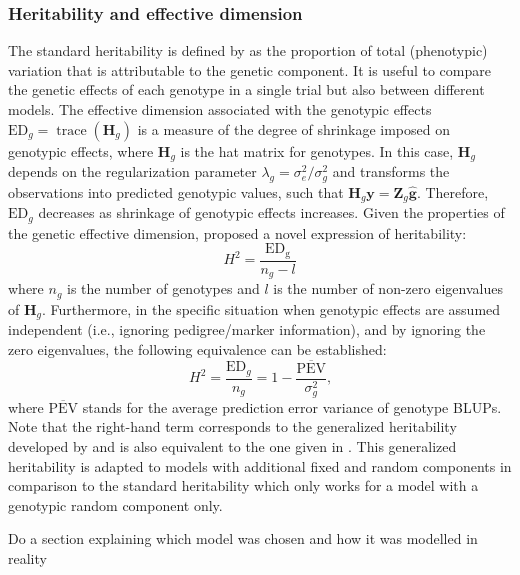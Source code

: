 \subsubsection{Heritability and effective dimension}
The standard heritability is defined by \textcite{rodriguez-alvarez_correcting_2018} as the proportion of total (phenotypic) variation that is attributable to the genetic component. It is useful to compare the genetic effects of each genotype in a single trial but also between different models. The effective dimension associated with the genotypic effects $\mathrm{ED}_g = \operatorname{trace}(\mathbf{H}_g)$ is a measure of the degree of shrinkage imposed on genotypic effects, where $\mathbf{H}_g$ is the hat matrix for genotypes. In this case, $\mathbf{H}_g$ depends on the regularization parameter $\lambda_g = \sigma^2_e/\sigma^2_g$ and transforms
the observations into predicted genotypic values, such
that $\mathbf{H}_g\mathbf{y} = \mathbf{Z}_g\mathbf{\hat{g}}$. Therefore, $\mathrm{ED}_g$ decreases as shrinkage of genotypic effects increases. Given the properties of the genetic effective dimension, \textcite{rodriguez2016spatial} proposed a novel expression of heritability:
\begin{equation}
    H^2 = \dfrac{\mathrm{ED_g}}{n_g-l}
\end{equation}
where $n_g$ is the number of genotypes and $l$ is the number of non-zero eigenvalues of $\mathbf{H}_g$. Furthermore, in the specific
situation when genotypic effects are assumed independent
(i.e., ignoring pedigree/marker information), and by ignoring
the zero eigenvalues, the following equivalence can be established:
\begin{equation}
    H^{2}=\frac{\mathrm{ED}_{g}}{n_{g}}=1-\frac{\overline{\mathrm{PEV}}}{\sigma_{g}^{2}}
    \text{,}
    \label{eq:new_heritability}
\end{equation}
where $\overline{\mathrm{PEV}}$ stands for the average prediction error variance of genotype BLUPs. Note that the right-hand term corresponds to the generalized heritability developed by \textcite{welham2010comparison} and is also equivalent to the one given in \textcite{cullis_design_2006}. This generalized heritability is adapted to models with additional fixed and random components in comparison to the standard heritability which only works for a model with a genotypic random component only.


\begin{formal}
Do a section explaining which model was chosen and how it was modelled in reality
\end{formal}

